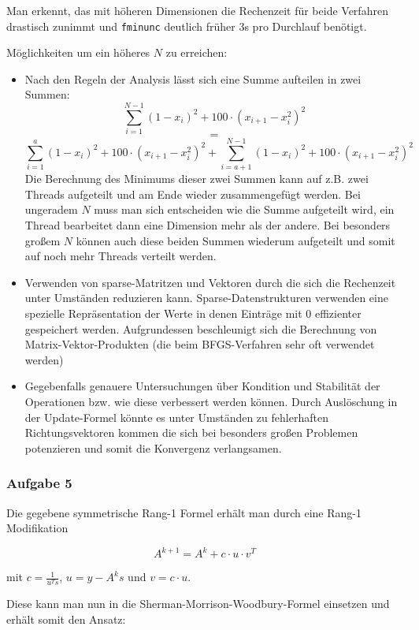 \documentclass[a4paper, 12pt]{report}
\begin{document}
Man erkennt, das mit höheren Dimensionen die Rechenzeit für beide Verfahren drastisch zunimmt und
\lstinline[basicstyle=\ttfamily\color{black}]|fminunc| deutlich früher 3s pro Durchlauf benötigt.\par

Möglichkeiten um ein höheres $N$ zu erreichen:
\begin{itemize}
  \item Nach den Regeln der Analysis lässt sich eine Summe aufteilen in zwei Summen:
  $$\sum_{i=1}^{N-1}(1 - x_i)^2 + 100\cdot(x_{i+1}-x_i^2)^2$$
  $$=$$
  $$\sum_{i=1}^{a}(1 - x_i)^2 + 100\cdot(x_{i+1}-x_i^2)^2 + \sum_{i=a+1}^{N-1}(1 - x_i)^2 + 100\cdot(x_{i+1}-x_i^2)^2$$
  Die Berechnung des Minimums dieser zwei Summen kann auf z.B. zwei Threads aufgeteilt und am Ende wieder zusammengefügt werden.
  Bei ungeradem $N$ muss man sich entscheiden wie die Summe aufgeteilt wird, ein Thread bearbeitet dann eine Dimension mehr als der andere.
  Bei besonders großem $N$ können auch diese beiden Summen wiederum aufgeteilt und somit auf noch mehr Threads verteilt werden.
  \item Verwenden von sparse-Matritzen und Vektoren durch die sich die Rechenzeit unter Umständen reduzieren kann. Sparse-Datenstrukturen
  verwenden eine spezielle Repräsentation der Werte in denen Einträge mit $0$ effizienter gespeichert werden. Aufgrundessen beschleunigt
  sich die Berechnung von Matrix-Vektor-Produkten (die beim BFGS-Verfahren sehr oft verwendet werden)
  \item Gegebenfalls genauere Untersuchungen über Kondition und Stabilität der Operationen bzw. wie diese verbessert werden können.
  Durch Auslöschung in der Update-Formel könnte es unter Umständen zu fehlerhaften Richtungsvektoren kommen die sich bei besonders
  großen Problemen potenzieren und somit die Konvergenz verlangsamen.
\end{itemize}

\subsubsection{Aufgabe 5}

Die gegebene symmetrische Rang-1 Formel erhält man durch eine Rang-1 Modifikation

$$A^{k + 1} = A^k + c\cdot u\cdot v^T$$

mit $c = \frac{1}{u^Ts}$, $u = y - A^ks$ und $v = c\cdot u$.

Diese kann man nun in die Sherman-Morrison-Woodbury-Formel einsetzen und erhält somit den Ansatz:
\end{document}
